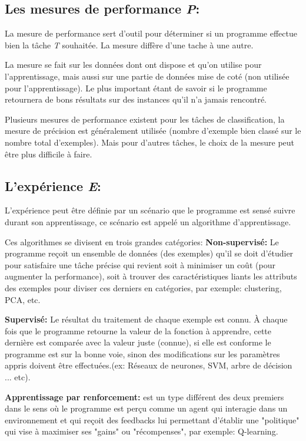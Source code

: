 \subsection{Les mesures de performance \textit{P}:}
La mesure de performance sert d'outil pour déterminer si un programme effectue bien la tâche \textit{T} souhaitée. La mesure diffère d'une tache à une autre. 

La mesure se fait sur les données dont ont dispose et qu'on utilise pour l'apprentissage, mais aussi sur une partie de données mise de coté (non utilisée pour l'apprentissage). Le plus important étant de savoir si le programme retournera de bons résultats sur des instances qu'il n'a jamais rencontré.   

Plusieurs mesures de performance existent pour les tâches de classification, la mesure de précision est généralement utilisée (nombre d'exemple bien classé sur le nombre total d'exemples). Mais pour d'autres tâches, le choix de la mesure peut être plus difficile à faire.

\subsection{L’expérience \textit{E}:}
L'expérience peut être définie par un scénario que le programme est sensé suivre durant son apprentissage, ce scénario est appelé un algorithme d'apprentissage.

Ces algorithmes se divisent en trois grandes catégories:
\textbf{Non-supervisé:} Le programme reçoit un ensemble de données (des exemples) qu'il se doit d'étudier pour satisfaire une tâche précise qui revient soit à minimiser un coût (pour augmenter la performance), soit à trouver des caractéristiques liants les attributs des exemples pour diviser ces derniers en catégories, par exemple: clustering, PCA, etc.

\textbf{Supervisé:} Le résultat du traitement de chaque exemple est connu. À chaque fois que le programme retourne la valeur de la fonction à apprendre, cette dernière est comparée avec la valeur juste (connue), si elle est conforme le programme est sur la bonne voie, sinon des modifications sur les paramètres appris doivent être effectuées.(ex: Réseaux de neurones, SVM, arbre de décision ... etc).

\textbf{Apprentissage par renforcement:} est un type différent des deux premiers dans le sens où le programme est perçu comme un agent qui interagie dans un environnement et qui reçoit des feedbacks lui permettant d’établir une "politique" qui vise à maximiser ses "gains" ou "récompenses", par exemple: Q-learning.


